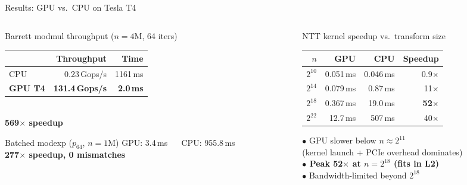 \documentclass[aspectratio=169,10pt]{beamer}
\begin{document}
\begin{frame}{Results: GPU vs.\ CPU on Tesla T4}

\begin{columns}
\begin{column}{0.48\textwidth}
  \begin{block}{\textcolor{gpugreen}{Barrett modmul throughput} ($n = 4$M, 64 iters)}
    \centering
    \begin{tabular}{lrr}
      \toprule
       & Throughput & Time \\
      \midrule
      CPU & 0.23\,Gops/s & 1161\,ms \\
      \textbf{GPU T4} & \textbf{131.4\,Gops/s} & \textbf{2.0\,ms} \\
      \bottomrule
    \end{tabular}\\[0.3em]
    {\Large \textbf{\textcolor{gpugreen}{569$\times$ speedup}}}
  \end{block}
  \vspace{0.3em}
  \begin{block}{\textcolor{gpugreen}{Batched modexp ($p_{64}$, $n = 1$M)}}
    \centering
    GPU: 3.4\,ms $\quad$ CPU: 955.8\,ms\\[0.2em]
    {\Large \textbf{\textcolor{gpugreen}{277$\times$ speedup}, 0 mismatches}}
  \end{block}
\end{column}
\begin{column}{0.50\textwidth}
  \begin{block}{NTT kernel speedup vs.\ transform size}
    \centering
    \begin{tabular}{rrrr}
      \toprule
      $n$ & GPU & CPU & Speedup \\
      \midrule
      $2^{10}$ & 0.051\,ms & 0.046\,ms & \textcolor{cpured}{0.9$\times$} \\
      $2^{14}$ & 0.079\,ms & 0.87\,ms  & 11$\times$ \\
      $2^{18}$ & 0.367\,ms & 19.0\,ms  & \textbf{52$\times$} \\
      $2^{22}$ & 12.7\,ms  & 507\,ms   & 40$\times$ \\
      \bottomrule
    \end{tabular}
    \vspace{0.3em}

    \small \textcolor{cpured}{$\bullet$ GPU slower below $n \approx 2^{11}$}\\
    (kernel launch + PCIe overhead dominates)\\
    \small \textbf{$\bullet$ Peak 52$\times$ at $n=2^{18}$ (fits in L2)}\\
    \small $\bullet$ Bandwidth-limited beyond $2^{18}$
  \end{block}
\end{column}
\end{columns}
\end{frame}
\end{document}
